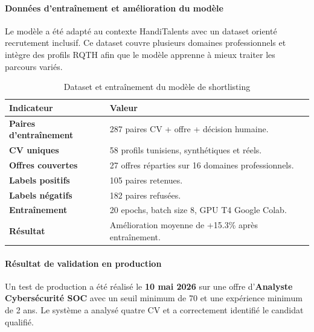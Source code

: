 \documentclass[12pt,a4paper]{report}
\newcommand{\tblhead}[1]{\cellcolor{darkblue}\color{white}\bfseries #1}
\newcommand{\tblleft}[1]{\bfseries\color{darkblue} #1}
\begin{document}
\paragraph{Données d'entraînement et amélioration du modèle}

Le modèle a été adapté au contexte HandiTalents avec un dataset orienté recrutement inclusif. Ce dataset couvre plusieurs domaines professionnels et intègre des profils RQTH afin que le modèle apprenne à mieux traiter les parcours variés.

\renewcommand{\arraystretch}{1.25}
\begin{table}[H]
\centering
\begin{tabularx}{0.92\textwidth}{|L{4.6cm}|Y|}
\hline
\tblhead{Indicateur} & \tblhead{Valeur} \\
\hline
\tblleft{Paires d'entraînement} & 287 paires CV + offre + décision humaine. \\
\hline
\tblleft{CV uniques} & 58 profils tunisiens, synthétiques et réels. \\
\hline
\tblleft{Offres couvertes} & 27 offres réparties sur 16 domaines professionnels. \\
\hline
\tblleft{Labels positifs} & 105 paires retenues. \\
\hline
\tblleft{Labels négatifs} & 182 paires refusées. \\
\hline
\tblleft{Entraînement} & 20 epochs, batch size 8, GPU T4 Google Colab. \\
\hline
\tblleft{Résultat} & Amélioration moyenne de +15.3\% après entraînement. \\
\hline
\end{tabularx}
\caption{Dataset et entraînement du modèle de shortlisting}
\label{tab:dataset-shortlisting}
\end{table}
\renewcommand{\arraystretch}{1}

\paragraph{Résultat de validation en production}

Un test de production a été réalisé le \textbf{10 mai 2026} sur une offre d'\textbf{Analyste Cybersécurité SOC} avec un seuil minimum de 70 et une expérience minimum de 2 ans. Le système a analysé quatre CV et a correctement identifié le candidat qualifié.
\end{document}
